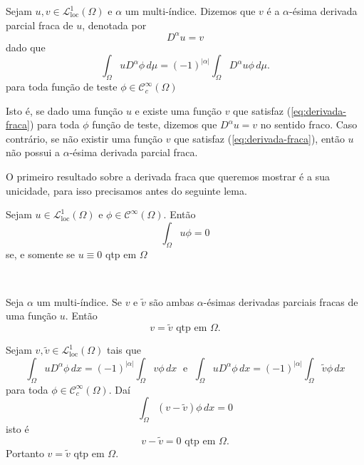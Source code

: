 \documentclass[a4paper, 11pt]{book}
\theoremstyle{definition}
\newcommand{\cC}{\mathcal{C}}
\newcommand{\cL}{\mathcal{L}}
\newcommand{\loc}{\mathrm{loc}}
\begin{document}
\begin{dbox}
    Sejam $u,v \in \cL^1_{\mathrm{loc}}(\Omega)$ e $\alpha$ um multi-índice. Dizemos que $v$ é a $\alpha$-ésima derivada parcial fraca de $u$, denotada por
    \[
        D^\alpha u = v
    \]
    dado que
    \begin{equation} \label{eq:derivada-fraca}
        \int_\Omega u D^\alpha \phi \,d\mu = (-1)^{|\alpha|} \int_\Omega D^\alpha u \phi \,d\mu.
    \end{equation}
    para toda função de teste $\phi \in \cC ^\infty_c(\Omega)$
\end{dbox}

Isto é, se dado uma função $u$ e existe uma função $v$ que satisfaz (\ref{eq:derivada-fraca}) para toda $\phi$ função de teste, dizemos que $D^\alpha u = v$ no sentido fraco.
Caso contrário, se não existir uma função $v$ que satisfaz (\ref{eq:derivada-fraca}), então $u$ não possui a $\alpha$-ésima derivada parcial fraca.

O primeiro resultado sobre a derivada fraca que queremos mostrar é a sua unicidade, para isso precisamos antes do seguinte lema.

\begin{lbox}
    Sejam $u \in \cL^1_{\loc}(\Omega)$ e $\phi \in \cC^\infty(\Omega)$.
    Então
    \[
        \int_\Omega u \phi = 0
    \]
    se, e somente se $u \equiv 0$ qtp em $\Omega$
\end{lbox}
\begin{prf}
    ~
\end{prf}

\begin{pbox}
    Seja $\alpha$ um multi-índice. Se $v$ e $\tilde v$ são ambas $\alpha$-ésimas derivadas parciais fracas de uma função $u$.
    Então
    \[
        v = \tilde v \text{ qtp em } \Omega.
    \]
\end{pbox}
\begin{prf}
    Sejam $v, \tilde v \in \cL^1_{\mathrm{loc}}(\Omega)$ tais que
    \[
        \int_\Omega u D^\alpha \phi \,dx = (-1)^{|\alpha|} \int_\Omega v \phi \,dx \;\text{ e }\; \int_\Omega u D^\alpha \phi \, dx= (-1)^{|\alpha|}\int_\Omega \tilde v \phi \,dx
    \]
    para toda $\phi \in \cC^\infty_c(\Omega)$. Daí
    \[
        \int_\Omega (v - \tilde v) \phi \, dx = 0
    \]
    isto é
    \[
        v - \tilde v = 0 \text{ qtp em } \Omega.
    \]
    Portanto $v = \tilde v$ qtp em $\Omega$.
\end{prf}
\end{document}
